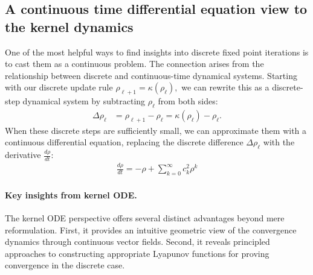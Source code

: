 \documentclass[twoside]{article}
\theoremstyle{definition}
\begin{document}
\subsection{A continuous time differential equation view to the kernel dynamics} 
One of the most helpful ways to find insights into discrete fixed point iterations is to cast them as a continuous problem. The connection arises from the relationship between discrete and continuous-time dynamical systems. Starting with our discrete update rule $\rho_{\ell+1} = \kappa(\rho_\ell),$
we can rewrite this as a discrete-step dynamical system by subtracting $\rho_\ell$ from both sides:
\begin{align*}
    \Delta \rho_\ell &= \rho_{\ell+1} - \rho_\ell = \kappa(\rho_\ell) - \rho_\ell.
\end{align*}
When these discrete steps are sufficiently small, we can approximate them with a continuous differential equation, replacing the discrete difference $\Delta \rho_\ell$ with the derivative $\frac{d\rho}{dt}$:
\begin{align}\tag{kernel ODE}\label{eq:kernel_ODE}
    \frac{d\rho}{dt} = -\rho + \sum_{k=0}^\infty c_k^2 \rho^k
\end{align}


\paragraph{Key insights from kernel ODE.} The kernel ODE perspective offers several distinct advantages beyond mere reformulation. First, it provides an intuitive geometric view of the convergence dynamics through continuous vector fields. Second, it reveals principled approaches to constructing appropriate Lyapunov functions for proving convergence in the discrete case. 
\end{document}
